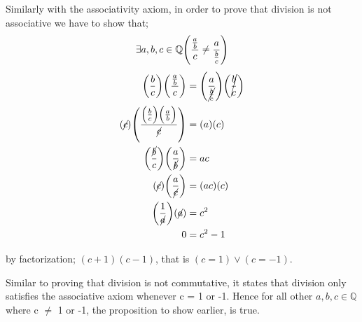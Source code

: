 \documentclass{article}
\newcommand{\paren}[1]{\mathopen{}\left( {#1}_{{}_{}}\,\negthickspace\right)\mathclose{}} %
\begin{document}
Similarly with the associativity axiom, in order to prove that division is not associative we have to
show that;
\[ 
    \exists a, b, c \in \mathbb{Q} \paren{\frac{\frac{a}{b}}{c} \neq \frac{a}{\frac{b}{c}}}
\]
\begin{align*}
    \paren{\frac{b}{c}}\paren{\frac{\frac{a}{b}}{c}} &= \paren{\frac{a}{\cancel{\frac{b}{c}}}} \paren{\cancel{\frac{b}{c}}} \\
    \paren{\cancel{c}}\paren{\frac{\paren{\frac{b}{c}}\paren{\frac{a}{b}}}{\cancel{c}}} &= (a)(c) \\
    \paren{\frac{\cancel{b}}{c}} \paren{\frac{a}{\cancel{b}}} &= ac \\
    \paren{\cancel{c}} \paren{\frac{a}{\cancel{c}}} &= \paren{ac} \paren{c} \\
    \paren{\frac{1}{\cancel{a}}} \paren{\cancel{a}} &= c^2 \\
    0 &= c^2 - 1
\end{align*}
\begin{center}
    by factorization; \((c+1)(c-1)\), that is \((c = 1) \lor (c = -1)\). 
\end{center}

Similar to proving that division is not commutative, it states that division only satisfies the 
associative axiom whenever c = 1 or -1. Hence for all other \(a, b, c \in \mathbb{Q}\) where c \(\neq\) 1 or -1, the 
proposition to show earlier, is true.
\end{document}
